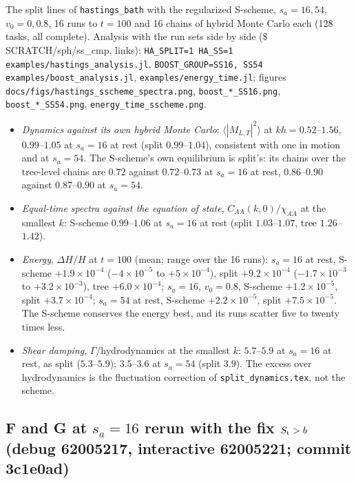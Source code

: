 \documentclass[11pt,aps,preprint,nofootinbib,superscriptaddress,tightenlines]{revtex4-2}
\begin{document}
The split lines of \texttt{hastings\_bath} with the regularized S-scheme, $s_a=16,54$, $v_0=0,0.8$, 16 runs to $t=100$ and 16 chains of hybrid Monte
Carlo each (128 tasks, all complete).  Analysis with the run sets side by side ($\$$SCRATCH/sph/ss\_cmp, links):
\texttt{HA\_SPLIT=1 HA\_SS=1} \nolinkurl{examples/hastings_analysis.jl}, \texttt{BOOST\_GROUP=SS16, SS54} \nolinkurl{examples/boost_analysis.jl},
\nolinkurl{examples/energy_time.jl}; figures \nolinkurl{docs/figs/hastings_sscheme_spectra.png}, \nolinkurl{boost_*_SS16.png}, \nolinkurl{boost_*_SS54.png},
\nolinkurl{energy_time_sscheme.png}.
\begin{itemize}
\item \emph{Dynamics against its own hybrid Monte Carlo}: $\langle|M_{L,T}|^2\rangle$ at $kh=0.52$--$1.56$, $0.99$--$1.05$ at $s_a=16$ at rest (split $0.99$--$1.04$),
  consistent with one in motion and at $s_a=54$.  The S-scheme's own equilibrium is split's: its chains over the tree-level chains are $0.72$ against
  $0.72$--$0.73$ at $s_a=16$ at rest, $0.86$--$0.90$ against $0.87$--$0.90$ at $s_a=54$.
\item \emph{Equal-time spectra against the equation of state}, $C_{AA}(k,0)/\chi_{AA}$ at the smallest $k$: S-scheme $0.99$--$1.06$ at $s_a=16$ at rest (split
  $1.03$--$1.07$, tree $1.26$--$1.42$).
\item \emph{Energy}, $\Delta H/H$ at $t=100$ (mean; range over the 16 runs): $s_a=16$ at rest, S-scheme $+1.9\times10^{-4}$ ($-4\times10^{-5}$ to $+5\times10^{-4}$),
  split $+9.2\times10^{-4}$ ($-1.7\times10^{-3}$ to $+3.2\times10^{-3}$), tree $+6.0\times10^{-4}$; $s_a=16$, $v_0=0.8$, S-scheme $+1.2\times10^{-5}$, split
  $+3.7\times10^{-4}$; $s_a=54$ at rest, S-scheme $+2.2\times10^{-5}$, split $+7.5\times10^{-5}$.  The S-scheme conserves the energy best, and its runs
  scatter five to twenty times less.
\item \emph{Shear damping}, $\Gamma$/hydrodynamics at the smallest $k$: $5.7$--$5.9$ at $s_a=16$ at rest, as split ($5.3$--$5.9$); $3.5$--$3.6$ at $s_a=54$
  (split $3.9$).  The excess over hydrodynamics is the fluctuation correction of \nolinkurl{split_dynamics.tex}, not the scheme.
\end{itemize}

\subsection*{F and G at $s_a=16$ rerun with the fix $S_{\rm t}>b$ (debug 62005217, interactive 62005221; commit 3c1e0ad)}
\end{document}
